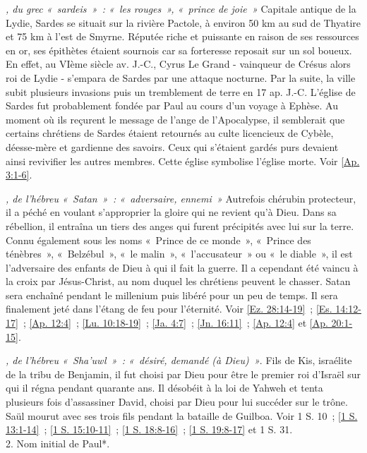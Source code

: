 \begin{multicols}{2}
\textit{, du grec «~sardeis~»~: «~les rouges~», «~prince de joie~»}\newline
Capitale antique de la Lydie, Sardes se situait sur la rivière Pactole, à environ 50 km au sud de Thyatire et 75 km à l'est de Smyrne. Réputée riche et puissante en raison de ses ressources en or, ses épithètes étaient sournois car sa forteresse reposait sur un sol boueux. En effet, au VIème siècle av. J.-C., Cyrus Le Grand - vainqueur de Crésus alors roi de Lydie - s'empara de Sardes par une attaque nocturne. Par la suite, la ville subit plusieurs invasions puis un tremblement de terre en 17 ap. J.-C. L'église de Sardes fut probablement fondée par Paul au cours d'un voyage à Ephèse. Au moment où ils reçurent le message de l'ange de l'Apocalypse, il semblerait que certains chrétiens de Sardes étaient retournés au culte licencieux de Cybèle, déesse-mère et gardienne des savoirs. Ceux qui s'étaient gardés purs devaient ainsi revivifier les autres membres. Cette église symbolise l'église morte. Voir \vref{Ap. 3:1-6}.

\textit{, de l'hébreu «~Satan~»~: «~adversaire, ennemi~»}\newline
Autrefois chérubin protecteur, il a péché en voulant s'approprier la gloire qui ne revient qu'à Dieu. Dans sa rébellion, il entraîna un tiers des anges qui furent précipités avec lui sur la terre. Connu également sous les noms «~Prince de ce monde~», «~Prince des ténèbres~», «~Belzébul~», «~le malin~», «~l'accusateur~» ou «~le diable~», il est l'adversaire des enfants de Dieu à qui il fait la guerre. Il a cependant été vaincu à la croix par Jésus-Christ, au nom duquel les chrétiens peuvent le chasser. Satan sera enchaîné pendant le millenium puis libéré pour un peu de temps. Il sera finalement jeté dans l'étang de feu pour l'éternité.\newline
Voir \vref{Ez. 28:14-19}~; \vref{Es. 14:12-17}~; \vref{Ap. 12:4}~; \vref{Lu. 10:18-19}~; \vref{Ja. 4:7}~; \vref{Jn. 16:11}~; \vref{Ap. 12:4} et \vref{Ap. 20:1-15}.

\textit{, de l'hébreu «~Sha'uwl~»~: «~désiré, demandé (à Dieu)~»}. Fils de Kis, israélite de la tribu de Benjamin, il fut choisi par Dieu pour être le premier roi d'Israël sur qui il régna pendant quarante ans. Il désobéit à la loi de Yahweh et tenta plusieurs fois d'assassiner David, choisi par Dieu pour lui succéder sur le trône. Saül mourut avec ses trois fils pendant la bataille de Guilboa. Voir 1 S. 10~; \vref{1 S. 13:1-14}~; \vref{1 S. 15:10-11}~; \vref{1 S. 18:8-16}~; \vref{1 S. 19:8-17} et 1 S. 31.
\\2. Nom initial de Paul*.


\end{multicols}
